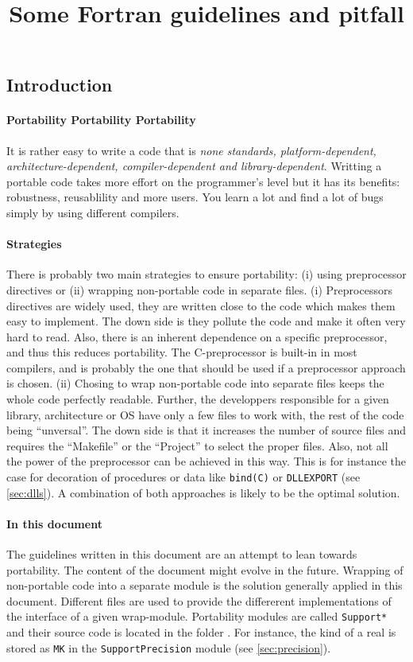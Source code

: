 \documentclass{article}
\title{Some Fortran guidelines and pitfall}
\begin{document}
\maketitle

\tableofcontents

\subsection*{Introduction}
\paragraph{Portability Portability Portability}
It is rather easy to write a code that is \textit{none standards, platform-dependent, architecture-dependent, compiler-dependent and library-dependent}.
Writting a portable code takes more effort on the programmer's level but it has its benefits: robustness, reusablility and more users. You learn a lot and find a lot of bugs simply by using different compilers.

\paragraph{Strategies}
There is probably two main strategies to ensure portability: (i) using preprocessor directives or (ii) wrapping non-portable code in separate files.
(i) Preprocessors directives are widely used, they are written close to the code which makes them easy to implement. The down side is they pollute the code and make it often very hard to read. Also, there is an inherent dependence on a specific preprocessor, and thus this reduces portability. The C-preprocessor is built-in in most compilers, and is probably the one that should be used if a preprocessor approach is chosen. 
(ii) Chosing to wrap non-portable code into separate files keeps the whole code perfectly readable. Further, the developpers responsible for a given library, architecture or OS have only a few files to work with, the rest of the code being ``unversal''.
The down side is that it increases the number of source files and requires the ``Makefile'' or the ``Project'' to select the proper files. 
Also, not all the power of the preprocessor can be achieved in this way.
This is for instance the case for decoration of procedures or data like \texttt{bind(C)} or \texttt{DLLEXPORT} (see \autoref{sec:dlls}).
A combination of both approaches is likely to be the optimal solution.

\paragraph{In this document}
The guidelines written in this document are an attempt to lean towards portability. The content of the document might evolve in the future.
Wrapping of non-portable code into a separate module is the solution generally applied in this document. Different files are used to provide the differerent implementations of the interface of a given wrap-module.  Portability modules are called \verb|Support*| and their source code is located in the folder .
For instance, the kind of a real is stored as \verb|MK| in the \verb|SupportPrecision| module (see \autoref{sec:precision}).
\end{document}
